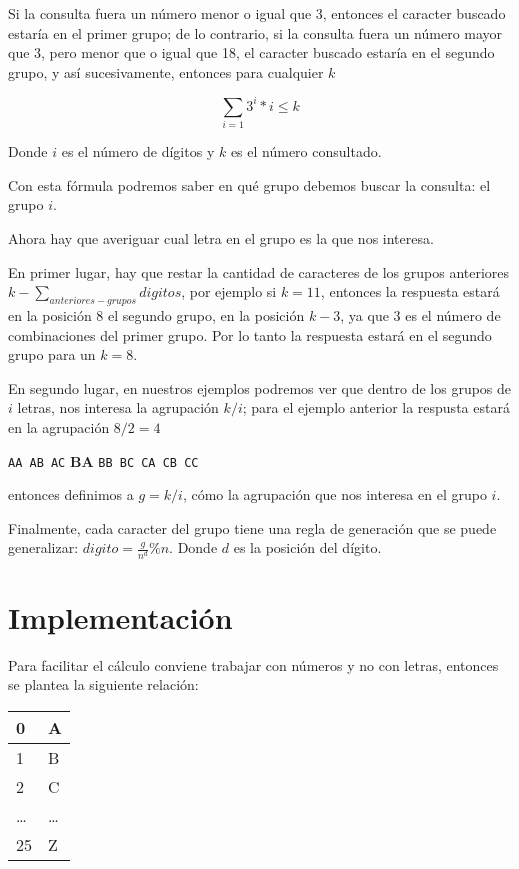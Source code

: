 \documentclass[a4paper,12pt]{article}
\begin{document}
Si la consulta fuera un número menor o igual que 3, entonces el caracter buscado estaría en el primer grupo; de lo contrario, si la consulta fuera un número mayor que 3, pero menor que o igual que 18, el caracter buscado estaría en el segundo grupo, y así sucesivamente, entonces para cualquier $k$

\begin{displaymath}
\sum_{i=1}3^i*i \leq k
\end{displaymath}

Donde $i$ es el número de dígitos y $k$ es el número consultado.

Con esta fórmula podremos saber en qué grupo debemos buscar la consulta: el grupo $i$. 

Ahora hay que averiguar cual letra en el grupo es la que nos interesa. 

En primer lugar, hay que restar la cantidad de caracteres de los grupos anteriores $k - \sum_{anteriores-grupos} digitos$, por ejemplo si $k=11$, entonces la respuesta estará en la posición 8 el segundo grupo, en la posición $k-3$, ya que $3$ es el número de combinaciones del primer grupo. Por lo tanto la respuesta estará en el segundo grupo para un $k=8$.

En segundo lugar, en nuestros ejemplos podremos ver que dentro de los grupos de $i$ letras, nos interesa la agrupación $k/i$; para el ejemplo anterior la respusta estará en la agrupación $8/2 = 4$

\verb|AA AB AC| \textbf{BA} \verb|BB BC CA CB CC|

entonces definimos a $g = k/i$, cómo la agrupación que nos interesa en el grupo $i$.

Finalmente, cada caracter del grupo tiene una regla de generación que se puede generalizar: $digito = \frac{g}{n^d}\%n$. Donde $d$ es la posición del dígito.

\section{Implementación}
Para facilitar el cálculo conviene trabajar con números y no con letras, entonces se plantea la siguiente relación:

\begin{center}
\begin{tabular}{|l|l|}
  \hline
  0 & A\\ \hline
  1 & B\\ \hline
  2 & C\\ \hline
  \ldots & \ldots \\ \hline
  25 & Z \\ \hline
\end{tabular}
\end{center}
\end{document}
